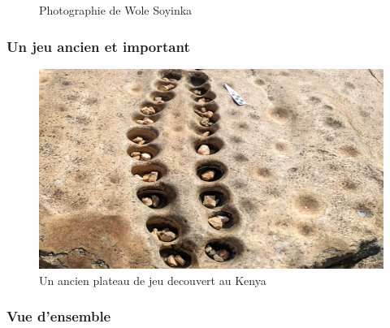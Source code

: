 \message{ !name(test.tex)}\documentclass{beamer}
\begin{document}
\begin{frame}
\begin{minipage}[b]{0.48\linewidth}
\begin{figure}
      \label{fig1}
      \caption{Photographie de Wole Soyinka}
    \end{figure}
  \end{minipage}
      
\end{frame}

\begin{frame}
  \frametitle{Un jeu ancien et important}
  \begin{figure}
    \centering
    \includegraphics[width=\linewidth]{ressources/ancien_plateau_jeu.png}
    \caption{Un ancien plateau de jeu decouvert au Kenya}
  \end{figure}
\end{frame}


\begin{frame}
  \frametitle{Vue d'ensemble}
  \tableofcontents
\end{frame}
\end{document}
